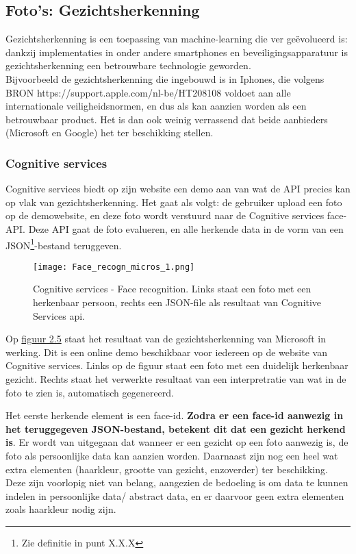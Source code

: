 \subsection{Foto's: Gezichtsherkenning}
Gezichtsherkenning is een toepassing van machine-learning die ver geëvolueerd is: dankzij implementaties in onder andere smartphones en beveiligingsapparatuur is gezichtsherkenning een betrouwbare technologie geworden. \\
Bijvoorbeeld de gezichtsherkenning die ingebouwd is in Iphones, die volgens BRON https://support.apple.com/nl-be/HT208108 voldoet aan alle internationale veiligheidsnormen, en dus als kan aanzien worden als een betrouwbaar product. 
Het is dan ook weinig verrassend dat beide aanbieders (Microsoft en Google) het ter beschikking stellen. 

\subsubsection{Cognitive services}
Cognitive services biedt op zijn website een demo aan van wat de API precies kan op vlak van gezichtsherkenning. Het gaat als volgt: de gebruiker upload een foto op de demowebsite, en deze foto wordt verstuurd naar de Cognitive services face-API. Deze API gaat de foto evalueren, en alle herkende data in de vorm van een JSON\footnote{Zie definitie in punt X.X.X}-bestand teruggeven. 

\begin{figure}[h]
	\texttt{[image: Face\_recogn\_micros\_1.png]}
	\caption{Cognitive services - Face recognition. Links staat een foto met een herkenbaar persoon, rechts een JSON-file als resultaat van Cognitive Services api.}
	\label{fig:cognitive}
\end{figure}

Op \hyperref[fig:cognitive]{figuur 2.5} staat het resultaat van de gezichtsherkenning van Microsoft in werking. Dit is een online demo beschikbaar voor iedereen op de website van Cognitive services. Links op de figuur staat een foto met een duidelijk herkenbaar gezicht. Rechts staat het verwerkte resultaat van een interpretratie van wat in de foto te zien is, automatisch gegenereerd. 

Het eerste herkende element is een face-id. \textbf{Zodra er een face-id aanwezig in het teruggegeven JSON-bestand, betekent dit dat een gezicht herkend is}. Er wordt van uitgegaan dat wanneer er een gezicht op een foto aanwezig is, de foto als persoonlijke data kan aanzien worden. 
Daarnaast zijn nog een heel wat extra elementen (haarkleur, grootte van gezicht, enzoverder) ter beschikking. Deze zijn voorlopig niet van belang, aangezien de bedoeling is om data te kunnen indelen in persoonlijke data/ abstract data, en er daarvoor geen extra elementen zoals haarkleur nodig zijn. 


